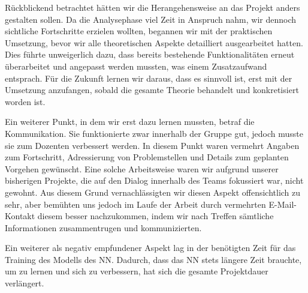 \documentclass[12pt,a4paper]{article}
\begin{document}
Rückblickend betrachtet hätten wir die Herangehensweise an das Projekt anders gestalten sollen. Da die Analysephase viel Zeit in Anspruch nahm, wir dennoch sichtliche Fortschritte erzielen wollten, begannen wir mit der praktischen Umsetzung, bevor wir alle theoretischen Aspekte detailliert ausgearbeitet hatten. Dies führte unweigerlich dazu, dass bereits bestehende Funktionalitäten erneut überarbeitet und angepasst werden mussten, was einem Zusatzaufwand entsprach. Für die Zukunft lernen wir daraus, dass es sinnvoll ist, erst mit der Umsetzung anzufangen, sobald die gesamte Theorie behandelt und konkretisiert worden ist.

Ein weiterer Punkt, in dem wir erst dazu lernen mussten, betraf die Kommunikation. Sie funktionierte zwar innerhalb der Gruppe gut, jedoch musste sie zum Dozenten verbessert werden. In diesem Punkt waren vermehrt Angaben zum Fortschritt, Adressierung von Problemstellen und Details zum geplanten Vorgehen gewünscht. Eine solche Arbeitsweise waren wir aufgrund unserer bisherigen Projekte, die auf den Dialog innerhalb des Teams fokussiert war, nicht gewohnt. Aus diesem Grund vernachlässigten wir diesen Aspekt offensichtlich zu sehr, aber bemühten uns jedoch im Laufe der Arbeit durch vermehrten E-Mail-Kontakt diesem besser nachzukommen, indem wir nach Treffen sämtliche Informationen zusammentrugen und kommunizierten.

Ein weiterer als negativ empfundener Aspekt lag in der benötigten Zeit für das Training des Modells des NN. Dadurch, dass das NN stets längere Zeit brauchte, um zu lernen und sich zu verbessern, hat sich die gesamte Projektdauer verlängert.



\pagebreak

\end{document}
